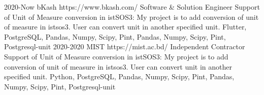 
\horizontalLineRight

\listItemOne
    {2020-Now}
    {bKash}
    {https://www.bkash.com/}
    {Software \& Solution Engineer}
    {Support of Unit of Measure conversion in istSOS3: My project is to add conversion of
    unit of measure in istsos3. User can convert unit in another specified unit.}
    {Flutter, PostgreSQL, Pandas, Numpy, Scipy, Pint,  Pandas, Numpy, Scipy, Pint, Postgresql-unit}
\listItemOne
    {2020-2020}
    {MIST}
    {https://mist.ac.bd/}
    {Independent Contractor}
    {Support of Unit of Measure conversion in istSOS3: My project is to add conversion of
    unit of measure in istsos3. User can convert unit in another specified unit.}
    {Python, PostgreSQL, Pandas, Numpy, Scipy, Pint,  Pandas, Numpy, Scipy, Pint, Postgresql-unit}%